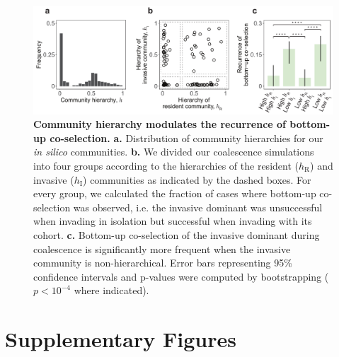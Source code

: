 \documentclass[a4paper,10pt]{article}
\begin{document}
\begin{figure}[!h]
\centering
\internallinenumbers
\includegraphics[scale=0.7,keepaspectratio]{figs/fig5_v2.pdf}
\caption{\textbf{Community hierarchy modulates the recurrence of bottom-up co-selection.}
\textbf{a.} Distribution of community hierarchies for our \textit{in silico} communities.
\textbf{b.} We divided our coalescence simulations into four groups according to the
hierarchies of the resident ($h_\mathrm{R}$) and invasive ($h_\mathrm{I}$) communities
as indicated by the dashed boxes.
For every group, we calculated the fraction of cases where bottom-up co-selection was observed,
i.e. the invasive dominant was unsuccessful when invading in isolation
but successful when invading with its cohort.
\textbf{c.} Bottom-up co-selection of the invasive dominant during coalescence
is significantly more frequent when the invasive community is non-hierarchical.
Error bars representing 95\% confidence intervals
and p-values were computed by bootstrapping
($p<10^{-4}$ where indicated).}
\label{fig5}
\end{figure}

\clearpage

\section*{Supplementary Figures}

\renewcommand{\thefigure}{S\arabic{figure}}
\setcounter{figure}{0} 
\end{document}
